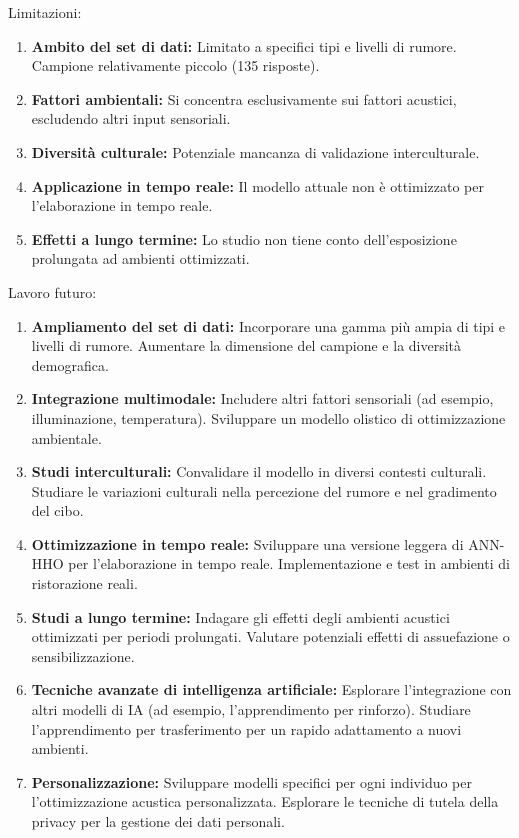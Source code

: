 Limitazioni:
\begin{enumerate}
    \item \textbf{Ambito del set di dati:} 
    Limitato a specifici tipi e livelli di rumore. Campione relativamente piccolo (135 risposte).
    \item \textbf{Fattori ambientali:} Si concentra esclusivamente sui fattori acustici, escludendo altri input sensoriali.
    \item \textbf{Diversità culturale:} Potenziale mancanza di validazione interculturale.
    \item \textbf{Applicazione in tempo reale:} Il modello attuale non è ottimizzato per l'elaborazione in tempo reale.
    \item \textbf{Effetti a lungo termine:} Lo studio non tiene conto dell'esposizione prolungata ad ambienti ottimizzati.
\end{enumerate}

Lavoro futuro:
\begin{enumerate}
    \item \textbf{Ampliamento del set di dati:} Incorporare una gamma più ampia di tipi e livelli di rumore. Aumentare la dimensione del campione e la diversità demografica.
    \item \textbf{Integrazione multimodale:} Includere altri fattori sensoriali (ad esempio, illuminazione, temperatura). Sviluppare un modello olistico di ottimizzazione ambientale.
    \item \textbf{Studi interculturali:} Convalidare il modello in diversi contesti culturali. Studiare le variazioni culturali nella percezione del rumore e nel gradimento del cibo.
    \item \textbf{Ottimizzazione in tempo reale:} Sviluppare una versione leggera di ANN-HHO per l'elaborazione in tempo reale. Implementazione e test in ambienti di ristorazione reali.
    \item \textbf{Studi a lungo termine:} Indagare gli effetti degli ambienti acustici ottimizzati per periodi prolungati. Valutare potenziali effetti di assuefazione o sensibilizzazione.
    \item \textbf{Tecniche avanzate di intelligenza artificiale:} Esplorare l'integrazione con altri modelli di IA (ad esempio, l'apprendimento per rinforzo). Studiare l'apprendimento per trasferimento per un rapido adattamento a nuovi ambienti.
    \item \textbf{Personalizzazione:} Sviluppare modelli specifici per ogni individuo per l'ottimizzazione acustica personalizzata. Esplorare le tecniche di tutela della privacy per la gestione dei dati personali.
\end{enumerate}


